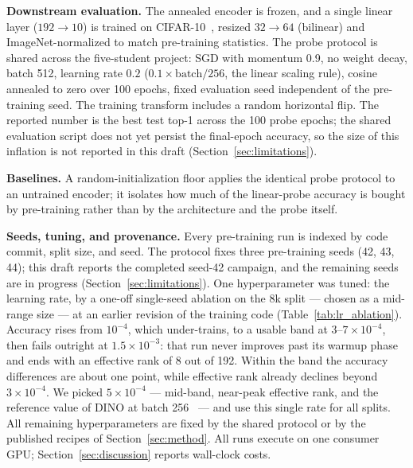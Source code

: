 \textbf{Downstream evaluation.}
The annealed encoder is frozen, and a single linear layer
($192\rightarrow10$) is trained on CIFAR-10~\cite{krizhevsky2009cifar},
resized $32\rightarrow64$ (bilinear) and ImageNet-normalized to match
pre-training statistics. The probe protocol is shared across the five-student
project: SGD with momentum 0.9, no weight decay, batch 512, learning rate
$0.2$ ($0.1 \times \mathrm{batch}/256$, the linear scaling rule), cosine
annealed to zero over 100 epochs, fixed evaluation seed independent of the
pre-training seed. The training transform includes a random horizontal
flip. The reported number is the best test top-1 across the 100 probe
epochs; the shared evaluation script does not yet persist the final-epoch
accuracy, so the size of this inflation is not reported in this draft
(Section~\ref{sec:limitations}).

\textbf{Baselines.}
A random-initialization floor applies the identical probe protocol to an
untrained encoder; it isolates how much of the linear-probe accuracy is
bought by pre-training rather than by the architecture and the probe itself.

\textbf{Seeds, tuning, and provenance.}
Every pre-training run is indexed by code commit, split size, and seed. The
protocol fixes three pre-training seeds (42, 43, 44); this draft reports the
completed seed-42 campaign, and the remaining seeds are in progress
(Section~\ref{sec:limitations}). One hyperparameter was tuned: the learning
rate, by a one-off single-seed ablation on the 8k split --- chosen as a
mid-range size --- at an earlier revision of the training code
(Table~\ref{tab:lr_ablation}). Accuracy rises from $10^{-4}$, which under-trains, to a usable band
at $3$--$7 \times 10^{-4}$, then fails outright at $1.5 \times 10^{-3}$:
that run never improves past its warmup phase and ends with an effective
rank of 8 out of 192. Within the band the accuracy differences are about one
point, while effective rank already declines beyond $3 \times 10^{-4}$. We
picked $5 \times 10^{-4}$ --- mid-band, near-peak effective rank, and the
reference value of DINO at batch 256~\cite{caron2021dino} --- and use this
single rate for all splits. All remaining hyperparameters are fixed by the
shared protocol or by the published recipes of Section~\ref{sec:method}.
All runs execute on one consumer GPU; Section~\ref{sec:discussion} reports
wall-clock costs.

